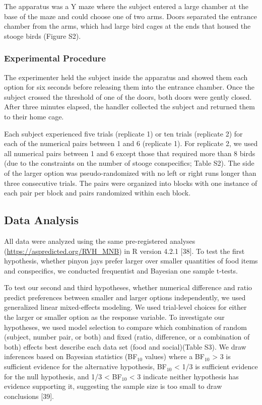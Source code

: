 \documentclass[
  ,doc,floatsintext]{apa6}
\begin{document}
The apparatus was a Y maze where the subject entered a large chamber at the base of the maze and could choose one of two arms. Doors separated the entrance chamber from the arms, which had large bird cages at the ends that housed the stooge birds (Figure S2).

\hypertarget{experimental-procedure-1}{%
\subsubsection{Experimental Procedure}\label{experimental-procedure-1}}

The experimenter held the subject inside the apparatus and showed them each option for six seconds before releasing them into the entrance chamber. Once the subject crossed the threshold of one of the doors, both doors were gently closed. After three minutes elapsed, the handler collected the subject and returned them to their home cage.

Each subject experienced five trials (replicate 1) or ten trials (replicate 2) for each of the numerical pairs between 1 and 6 (replicate 1). For replicate 2, we used all numerical pairs between 1 and 6 except those that required more than 8 birds (due to the constraints on the number of stooge conspecifics; Table S2). The side of the larger option was pseudo-randomized with no left or right runs longer than three consecutive trials. The pairs were organized into blocks with one instance of each pair per block and pairs randomized within each block.

\hypertarget{data-analysis}{%
\subsection{Data Analysis}\label{data-analysis}}

All data were analyzed using the same pre-registered analyses (\url{https://aspredicted.org/RVH_MNB}) in R version 4.2.1 {[}38{]}. To test the first hypothesis, whether pinyon jays prefer larger over smaller quantities of food items and conspecifics, we conducted frequentist and Bayesian one sample t-tests.

To test our second and third hypotheses, whether numerical difference and ratio predict preferences between smaller and larger options independently, we used generalized linear mixed-effects modeling. We used trial-level choices for either the larger or smaller option as the response variable. To investigate our hypotheses, we used model selection to compare which combination of random (subject, number pair, or both) and fixed (ratio, difference, or a combination of both) effects best describe each data set (food and social)(Table S3). We draw inferences based on Bayesian statistics (BF\(_{10}\) values) where a BF\(_{10}\) \textgreater{} 3 is sufficient evidence for the alternative hypothesis, BF\(_{10}\) \textless{} 1/3 is sufficient evidence for the null hypothesis, and 1/3 \textless{} BF\(_{10}\) \textless{} 3 indicate neither hypothesis has evidence supporting it, suggesting the sample size is too small to draw conclusions {[}39{]}.
\end{document}
